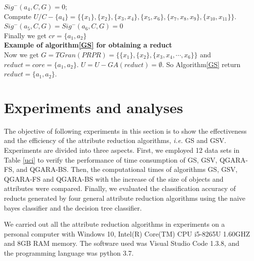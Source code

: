 \documentclass[review]{elsarticle}
\begin{document}
		$Sig^-(a_4,C,G)=0$;\\
		Compute $U/C-\{a_4\}=\{\{x_1\},\{x_2\},\{x_3,x_4\},\{x_5,x_6\},\{x_7,x_8,x_9\},\{x_{10},x_{11}\}\}$.\\
		$Sig^-(a_5,C,G)=Sig^-(a_6,C,G)=0$\\
		Finally we get $cr=\{a_1,a_2\}$
		\\\textbf{Example of algorithm\ref{GS} for obtaining a reduct}\\
		Now we get $G=TGran(PRPR)=\{\{x_1\},\{x_2\},\{x_3,x_4,\cdots,x_6\}\}$ and $reduct=core=\{a_1,a_2\}$. $U=U-GA(reduct)=\emptyset$. So Algorithm\ref{GS} return $reduct=\{a_1,a_2\}$.

\section{Experiments and analyses}\label{exps}
	\par The objective of following experiments in this section is to show the effectiveness and the efficiency of the attribute reduction algorithms, \emph{i.e.} GS and GSV. Experiments are divided into three aspects. First, we employed 12 data sets in Table \ref{uci} to verify the performance of time consumption of GS, GSV, QGARA-FS, and QGARA-BS. Then, the computational times of algorithms GS, GSV, QGARA-FS and QGARA-BS with the increase of the size of objects and attributes were compared. Finally, we evaluated the classification accuracy of reducts generated by four general attribute reduction algorithms using the naive bayes classifier and the decision tree classifier.
	\par We carried out all the attribute reduction algorithms in experiments on a personal computer with Windows 10, Intel(R) Core(TM) CPU i5-8265U 1.60GHZ and 8GB RAM memory. The software used was Visual Studio Code 1.3.8, and the programming language was python 3.7.
\end{document}
